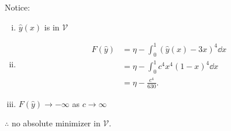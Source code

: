 \documentclass[12pt,twoside]{article}
\begin{document}
\begin{enumerate}
\begin{figure}[ht]
  \end{figure}
  Notice:
  \begin{enumerate}[(i)]
  \item $\hat{y}(x)$ is in $\mathcal{V}$
  \item
    \begin{align*}
      F(\hat{y}) &= \eta - \int_0^1{(\hat{y}(x)-3x)}^4\dd{x} \\
      &= \eta - \int_0^1c^4x^4{(1-x)}^4\dd{x} \\
      &= \eta - \frac{c^4}{630}.
    \end{align*}
  \item $F(\hat{y})\rightarrow -\infty$ as $c\rightarrow\infty$
  \end{enumerate}
  $\therefore$ no absolute minimizer in $\mathcal{V}$.
\end{enumerate}
\end{document}
